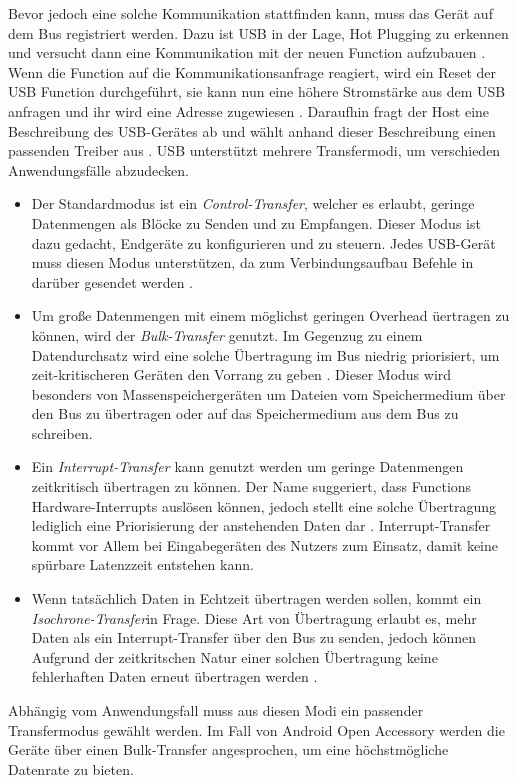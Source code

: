 	Bevor jedoch eine solche Kommunikation stattfinden kann, muss das Gerät auf dem Bus registriert werden. Dazu ist USB in der Lage, Hot Plugging zu erkennen und versucht dann eine Kommunikation mit der neuen Function aufzubauen \cite[S.45]{Kelm}. Wenn die Function auf die Kommunikationsanfrage reagiert, wird ein Reset der USB Function durchgeführt, sie kann nun eine höhere Stromstärke aus dem USB anfragen und ihr wird eine Adresse zugewiesen \cite[S.94f]{Kelm}. Daraufhin fragt der Host eine Beschreibung des USB-Gerätes ab und wählt anhand dieser Beschreibung einen passenden Treiber aus \cite[S.95]{Kelm}. USB unterstützt mehrere Transfermodi, um verschieden Anwendungsfälle abzudecken. 
	\begin{itemize}
	\item Der Standardmodus ist ein {\it Control-Transfer}, welcher es erlaubt, geringe Datenmengen als Blöcke zu Senden und zu Empfangen. Dieser Modus ist dazu gedacht, Endgeräte zu konfigurieren und zu steuern. Jedes USB-Gerät muss diesen Modus unterstützen, da zum Verbindungsaufbau Befehle in darüber gesendet werden \cite[S.79]{axelson}.
	\item Um große Datenmengen mit einem möglichst geringen Overhead üertragen zu können, wird der {\it Bulk-Transfer} genutzt. Im Gegenzug zu einem Datendurchsatz wird eine solche Übertragung im Bus niedrig priorisiert, um zeit-kritischeren Geräten den Vorrang zu geben \cite[S.85]{axelson}. Dieser Modus wird besonders von Massenspeichergeräten um Dateien vom Speichermedium über den Bus zu übertragen oder auf das Speichermedium aus dem Bus zu schreiben.
	\item Ein {\it Interrupt-Transfer} kann genutzt werden um geringe Datenmengen zeitkritisch übertragen zu können. Der Name suggeriert, dass Functions Hardware-Interrupts auslösen können, jedoch stellt eine solche Übertragung lediglich eine Priorisierung der anstehenden Daten dar \cite[S.88]{axelson}. Interrupt-Transfer kommt vor Allem bei Eingabegeräten des Nutzers zum Einsatz, damit keine spürbare Latenzzeit entstehen kann.
	\item  Wenn tatsächlich Daten in Echtzeit übertragen werden sollen, kommt ein {\it Isochrone-Transfer}in Frage. Diese Art von Übertragung erlaubt es, mehr Daten als ein Interrupt-Transfer über den Bus zu senden, jedoch können Aufgrund der zeitkritschen Natur einer solchen Übertragung keine fehlerhaften Daten erneut übertragen werden \cite[S.85]{axelson}.
	\end{itemize}
	Abhängig vom Anwendungsfall muss aus diesen Modi ein passender Transfermodus gewählt werden. Im Fall von Android Open Accessory werden die Geräte über einen Bulk-Transfer angesprochen, um eine höchstmögliche Datenrate zu bieten.
